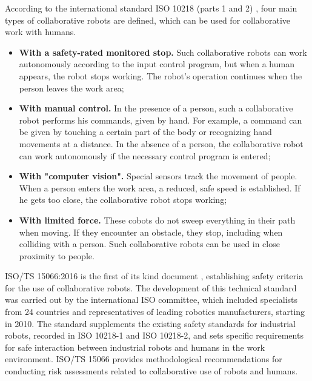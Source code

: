 According to the international standard ISO 10218 (parts 1 and 2) \citep{iso1021812011}, four main types of collaborative robots \citep{robotiqWhatDoes} are defined, which can be used for collaborative work with humans.
\begin{itemize}
	\item \textbf{With a safety-rated monitored stop.} Such collaborative robots can work autonomously according to the input control program, but when a human appears, the robot stops working. The robot's operation continues when the person leaves the work area;
	\item \textbf{With manual control.} In the presence of a person, such a collaborative robot performs his commands, given by hand. For example, a command can be given by touching a certain part of the body or recognizing hand movements at a distance. In the absence of a person, the collaborative robot can work autonomously if the necessary control program is entered;
	\item \textbf{With "computer vision".} Special sensors track the movement of people. When a person enters the work area, a reduced, safe speed is established. If he gets too close, the collaborative robot stops working;
	\item \textbf{With limited force.} These cobots do not sweep everything in their path when moving. If they encounter an obstacle, they stop, including when colliding with a person. Such collaborative robots can be used in close proximity to people.
\end{itemize}

ISO/TS 15066:2016 is the first of its kind document \citep{isoISOTS150662016}, establishing safety criteria for the use of collaborative robots. The development of this technical standard was carried out by the international ISO committee, which included specialists from 24 countries and representatives of leading robotics manufacturers, starting in 2010. The standard supplements the existing safety standards for industrial robots, recorded in ISO 10218-1 and ISO 10218-2, and sets specific requirements for safe interaction between industrial robots and humans in the work environment. ISO/TS 15066 provides methodological recommendations for conducting risk assessments related to collaborative use of robots and humans.

